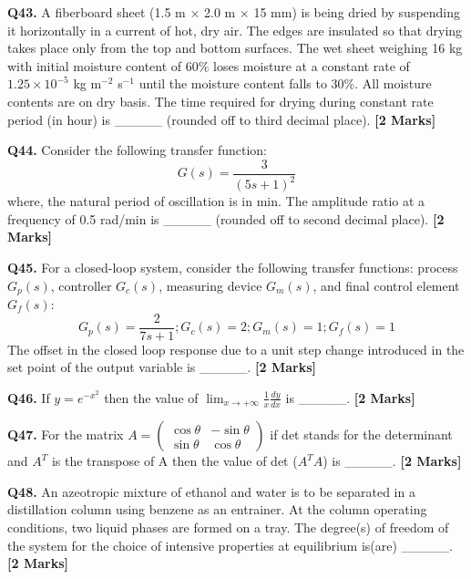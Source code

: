 \documentclass[11pt]{article}
\newcommand{\questionb}[2]{
    \noindent\textbf{Q#2.} #1 \hfill \textbf{[2 Marks]}
}
\begin{document}
\questionb{A fiberboard sheet (1.5 m × 2.0 m × 15 mm) is being dried by suspending it horizontally in a current of hot, dry air. The edges are insulated so that drying takes place only from the top and bottom surfaces. The wet sheet weighing 16 kg with initial moisture content of 60\% loses moisture at a constant rate of \(1.25 \times 10^{-5}\) kg m\(^{-2}\) s\(^{-1}\) until the moisture content falls to 30\%. All moisture contents are on dry basis. The time required for drying during constant rate period (in hour) is \_\_\_\_\_ (rounded off to third decimal place).}{43}
\vspace{0.5 cm}

\questionb{Consider the following transfer function:
\[G(s) = \frac{3}{(5s+1)^2}\]
where, the natural period of oscillation is in min. The amplitude ratio at a frequency of 0.5 rad/min is \_\_\_\_\_ (rounded off to second decimal place).}{44}
\vspace{0.5 cm}

\questionb{For a closed-loop system, consider the following transfer functions: process \(G_p(s)\), controller \(G_c(s)\), measuring device \(G_m(s)\), and final control element \(G_f(s)\):
\[G_p(s) = \frac{2}{7s+1}; G_c(s) = 2; G_m(s) = 1; G_f(s) = 1\]
The offset in the closed loop response due to a unit step change introduced in the set point of the output variable is \_\_\_\_\_.}{45}
\vspace{0.5 cm}

\questionb{If \(y = e^{-x^2}\) then the value of \(\lim_{x \to +\infty} \frac{1}{x} \frac{dy}{dx}\) is \_\_\_\_\_.}{46}
\vspace{0.5 cm}

\questionb{For the matrix \(A = \begin{pmatrix} \cos \theta & -\sin \theta \\ \sin \theta & \cos \theta \end{pmatrix}\) if det stands for the determinant and \(A^T\) is the transpose of A then the value of det (\(A^T A\)) is \_\_\_\_\_.}{47}
\vspace{0.5 cm}

\questionb{An azeotropic mixture of ethanol and water is to be separated in a distillation column using benzene as an entrainer. At the column operating conditions, two liquid phases are formed on a tray. The degree(s) of freedom of the system for the choice of intensive properties at equilibrium is(are) \_\_\_\_\_.}{48}
\vspace{0.5 cm}
\end{document}
